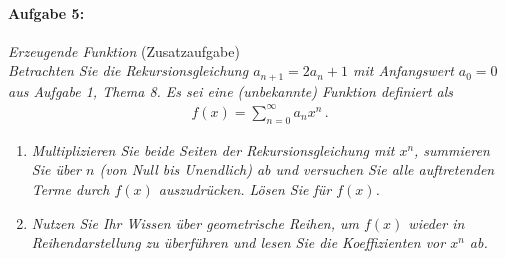\paragraph{Aufgabe 5: } \emph{Erzeugende Funktion} \hfill (Zusatzaufgabe)\\[0.2cm]
\emph{Betrachten Sie die Rekursionsgleichung $a_{n+1}=2a_n+1$ mit Anfangswert $a_0=0$ aus Aufgabe 1, Thema 8. Es sei eine (unbekannte) Funktion definiert als}
\begin{align*}
f(x)=\sum\limits_{n=0}^\infty a_n x^n\,.
\end{align*}
\begin{enumerate}[label=(\alph*)]
\item \emph{Multiplizieren Sie beide Seiten der Rekursionsgleichung mit $x^n$, summieren Sie über $n$ (von Null bis Unendlich) ab und versuchen Sie alle auftretenden Terme durch $f(x)$ auszudrücken. Lösen Sie für $f(x)$.}
\item \emph{Nutzen Sie Ihr Wissen über geometrische Reihen, um $f(x)$ wieder in Reihendarstellung zu überführen und lesen Sie die Koeffizienten vor $x^n$ ab.}
\end{enumerate}
%
%